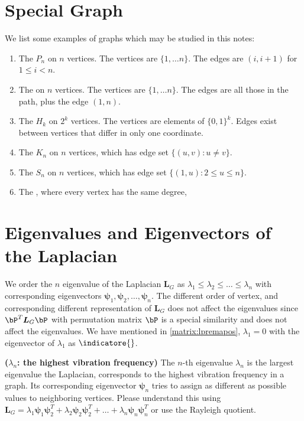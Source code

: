 \documentclass{article}
\newcommand{\bsl}[1]{\boldsymbol{#1}}
\newcommand{\bfs}[1]{\textbf{({#1}) }}
\begin{document}
\section{Special Graph}
We list some examples of graphs which may be studied in this notes:
\begin{enumerate}
    \item The  $P_n$ on $n$ vertices. The vertices are $\{1, \ldots n\}$. The edges are $(i, i+1)$ for $1 \leq i<n$.
    \item The  on $n$ vertices. The vertices are $\{1, \ldots n\}$. The edges are all those in the path, plus the edge $(1, n)$.
    \item The  $H_k$ on $2^{k}$ vertices. The vertices are elements of $\{0,1\}^{k}$. Edges exist between vertices that differ in only one coordinate.
    \item The  $K_{n}$ on $n$ vertices, which has edge set $\{(u, v): u \neq v\}$.
    \item  The  $S_{n}$ on $n$ vertices, which has edge set $\{(1, u): 2 \leq u \leq n\}$.
    \item The , where every vertex has the same degree,
\end{enumerate}


\section{Eigenvalues and Eigenvectors of the Laplacian}

We order the $n$ eigenvalue of the Laplacian $\bsl{L}_G$ as $\lambda_1\le \lambda_2\le\ldots \le \lambda_n$ with corresponding eigenvectors $\boldsymbol{\psi}_1,\boldsymbol{\psi}_2,\ldots,\boldsymbol{\psi}_n$.  The different order of vertex, and corresponding different representation of  $\bsl{L}_G$  does not affect the eigenvalues since $\bP^T\bsl{L}_G\bP$ with permutation matrix $\bP$ is a special similarity and does not affect the eigenvalues. We have mentioned in \cref{matrix:lpremapos}, $\lambda_1=0$ with the eigenvector of $\lambda_1$ as $\indicatore{}$.


\begin{rema}{\bfs{$\lambda_n$: the highest vibration frequency}}
The $n$-th eigenvalue $\lambda_n$ is the largest eigenvalue the Laplacian, corresponds to the highest vibration frequency  in a graph. Its corresponding eigenvector $\boldsymbol{\psi}_n$ tries to assign as different as possible values to neighboring vertices. Please understand this using $\bsl{L}_G=\lambda_1\boldsymbol{\psi}_1\boldsymbol{\psi}_2^T+\lambda_2 \boldsymbol{\psi}_2\boldsymbol{\psi}_2^T+\ldots+\lambda_n\boldsymbol{\psi}_n\boldsymbol{\psi}_n^T$ or use the Rayleigh quotient.
\end{rema}
\end{document}
